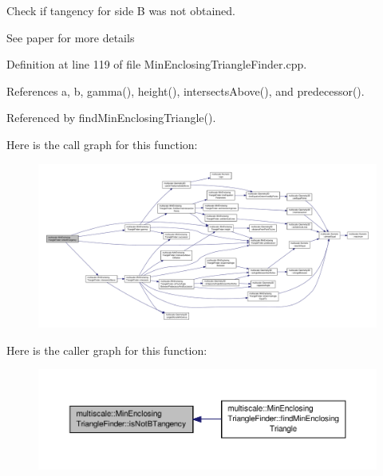 Check if tangency for side B was not obtained. 

See paper for more details 

Definition at line 119 of file Min\-Enclosing\-Triangle\-Finder.\-cpp.



References a, b, gamma(), height(), intersects\-Above(), and predecessor().



Referenced by find\-Min\-Enclosing\-Triangle().



Here is the call graph for this function\-:\nopagebreak
\begin{figure}[H]
\begin{center}
\leavevmode
\includegraphics[width=350pt]{classmultiscale_1_1MinEnclosingTriangleFinder_a9f071f42dbaff51c8975da1b77c1188e_cgraph}
\end{center}
\end{figure}




Here is the caller graph for this function\-:\nopagebreak
\begin{figure}[H]
\begin{center}
\leavevmode
\includegraphics[width=350pt]{classmultiscale_1_1MinEnclosingTriangleFinder_a9f071f42dbaff51c8975da1b77c1188e_icgraph}
\end{center}
\end{figure}


